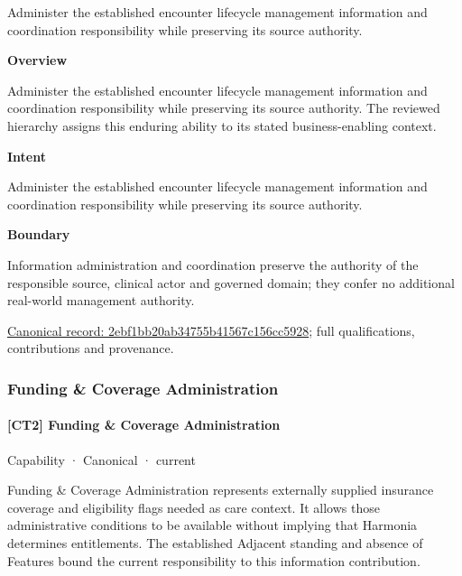 Administer the established encounter lifecycle management information and coordination responsibility while preserving its source authority.



\textbf{Overview}



Administer the established encounter lifecycle management information and coordination responsibility while preserving its source authority. The reviewed hierarchy assigns this enduring ability to its stated business-enabling context.



\textbf{Intent}



Administer the established encounter lifecycle management information and coordination responsibility while preserving its source authority.



\textbf{Boundary}



Information administration and coordination preserve the authority of the responsible source, clinical actor and governed domain; they confer no additional real-world management authority.


{\footnotesize \href{../../../../continuum/strategy/capability/2ebf1bb20ab34755b41567c156cc5928.md}{Canonical record: 2ebf1bb20ab34755b41567c156cc5928}; full qualifications, contributions and provenance.}\par
\subsubsection{Funding \& Coverage Administration}

\paragraph{[CT2] Funding \& Coverage Administration}

\label{element:640432d413cf47928ea2b3d221f92313}
{\small Capability · Canonical · current}\par

Funding \& Coverage Administration represents externally supplied insurance coverage and eligibility flags needed as care context. It allows those administrative conditions to be available without implying that Harmonia determines entitlements. The established Adjacent standing and absence of Features bound the current responsibility to this information contribution.




